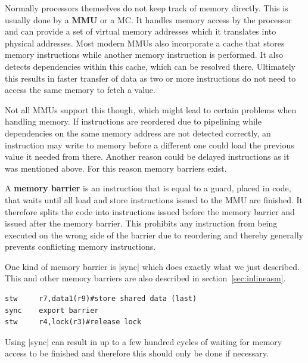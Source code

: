 {Normally processors themselves do not keep track of memory directly.
This is usually done by a \textbf{\ac{MMU}} or a \ac{MC}.
It handles memory access by the processor and can provide a set of virtual memory addresses which it translates into physical addresses.
Most modern \ac{MMU}s also incorporate a cache that stores memory instructions while another memory instruction is performed.
It also detects dependencies within this cache, which can be resolved there.
Ultimately this results in faster transfer of data as two or more instructions do not need to access the same memory to fetch a value.

Not all \ac{MMU}s support this though, which might lead to certain problems when handling memory.
If instructions are reordered due to pipelining while dependencies on the same memory address are not detected correctly, an instruction may write to memory before a different one could load the previous value it needed from there.
Another reason could be delayed instructions as it was mentioned above.
For this reason memory barriers exist.

A \textbf{memory barrier} is an instruction that is equal to a guard, placed in code, that waits until all load and store instructions issued to the \ac{MMU} are finished.
It therefore splits the code into instructions issued before the memory barrier and issued after the memory barrier.
This prohibits any instruction from being executed on the wrong side of the barrier due to reordering and thereby generally prevents conflicting memory instructions.

One kind of memory barrier is |sync| which does exactly what we just described.
This and other memory barriers are also described in section~\ref{sec:inlineasm}.

\begin{lstlisting}[caption=The memory barrier ensures that the first store was performed before the second store is issued., label=lst:sync]
stw     r7,data1(r9)#store shared data (last)
sync    export barrier
stw     r4,lock(r3)#release lock
\end{lstlisting}

Using |sync| can result in up to a few hundred cycles of waiting for memory access to be finished and therefore this should only be done if necessary.

}
